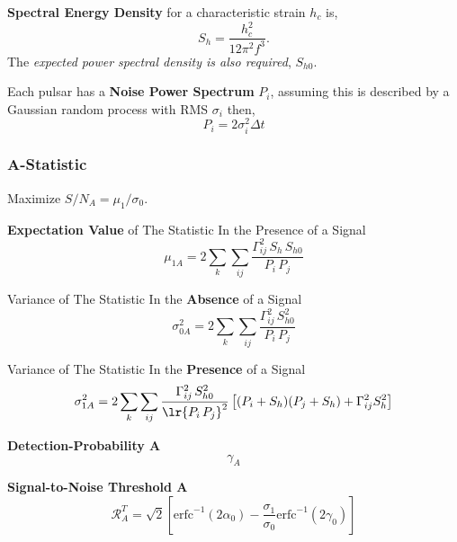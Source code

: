 \documentclass[10pt, oneside, onecolumn]{article}   	%
\newcommand\erfcinv[1]{\mathrm{erfc}^{-1}\left(#1\right)}
\newcommand\snr{\mathcal{R}}
\newcommand\pulsarsum{\sum_k \sum_{ij}}
\begin{document}
        \textbf{Spectral Energy Density} for a characteristic strain $h_c$ is,
        \begin{equation}
        S_h = \frac{h_c^2}{12 \pi^2 f^3}.
        \end{equation}
        The \textit{expected power spectral density is also required}, $S_{h0}$.

        Each pulsar has a \textbf{Noise Power Spectrum} $P_i$, assuming this is described by a Gaussian random process with RMS $\sigma_i$ then,
        \begin{equation}
        P_i = 2\sigma_i^2 \Delta t
        \end{equation}

        \subsubsection{A-Statistic}
        Maximize $S/N_A = \mu_1 / \sigma_0$.

        \noindent \textbf{Expectation Value} of The Statistic In the Presence of a Signal
        \begin{equation}
        \mu_{1A} = 2 \pulsarsum \frac{\Gamma_{ij}^2 \, S_h \, S_{h0}}{P_i \, P_j}
        \end{equation}

        \noindent Variance of The Statistic In the \textbf{Absence} of a Signal
        \begin{equation}
        \sigma_{0A}^2 = 2 \pulsarsum \frac{\Gamma_{ij}^2 \, S_{h0}^2}{P_i \, P_j}
        \end{equation}

        \noindent Variance of The Statistic In the \textbf{Presence} of a Signal
        \begin{equation}
        \sigma_{1A}^2 = 2 \pulsarsum \frac{\Gamma_{ij}^2 \, S_{h0}^2}{\lr{P_i \, P_j}^2} \left[(P_i + S_h)(P_j + S_h) + \Gamma_{ij}^2 S_h^2\right]
        \end{equation}

        \noindent \textbf{Detection-Probability A}
        \begin{equation}
        \gamma_A
        \end{equation}

        \noindent \textbf{Signal-to-Noise Threshold A}
        \begin{equation}
        \label{eq:snr_thresh_a}
        \snr_A^T = \sqrt{2} \left[ \erfcinv{2\alpha_0} - \frac{\sigma_1}{\sigma_0} \erfcinv{2\gamma_0} \right]
        \end{equation}
\end{document}
